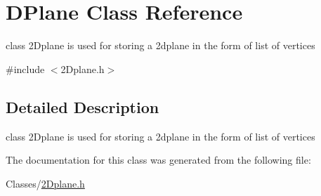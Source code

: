 \hypertarget{class_d_plane}{}\section{D\+Plane Class Reference}
\label{class_d_plane}


class 2\+Dplane is used for storing a 2dplane in the form of list of vertices  




{\ttfamily \#include $<$2\+Dplane.\+h$>$}



\subsection{Detailed Description}
class 2\+Dplane is used for storing a 2dplane in the form of list of vertices 

The documentation for this class was generated from the following file\+:\begin{DoxyCompactItemize}
\item 
Classes/\mbox{\hyperlink{2_dplane_8h}{2\+Dplane.\+h}}\end{DoxyCompactItemize}
